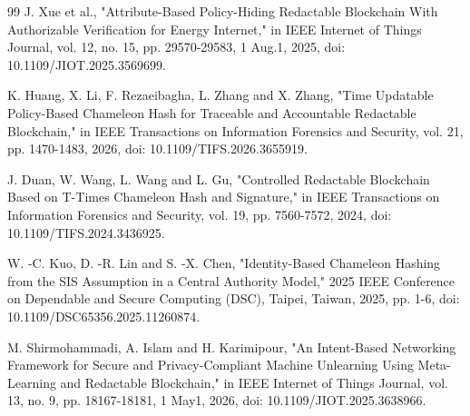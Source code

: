 \documentclass[lettersize,journal]{IEEEtran}
\begin{document}
\begin{thebibliography}{99}
    J. Xue et al., "Attribute-Based Policy-Hiding Redactable Blockchain With Authorizable Verification for Energy Internet," in IEEE Internet of Things Journal, vol. 12, no. 15, pp. 29570-29583, 1 Aug.1, 2025, doi: 10.1109/JIOT.2025.3569699.
    
    
    K. Huang, X. Li, F. Rezaeibagha, L. Zhang and X. Zhang, "Time Updatable Policy-Based Chameleon Hash for Traceable and Accountable Redactable Blockchain," in IEEE Transactions on Information Forensics and Security, vol. 21, pp. 1470-1483, 2026, doi: 10.1109/TIFS.2026.3655919.
    
    J. Duan, W. Wang, L. Wang and L. Gu, "Controlled Redactable Blockchain Based on T-Times Chameleon Hash and Signature," in IEEE Transactions on Information Forensics and Security, vol. 19, pp. 7560-7572, 2024, doi: 10.1109/TIFS.2024.3436925. 
    
    W. -C. Kuo, D. -R. Lin and S. -X. Chen, "Identity-Based Chameleon Hashing from the SIS Assumption in a Central Authority Model," 2025 IEEE Conference on Dependable and Secure Computing (DSC), Taipei, Taiwan, 2025, pp. 1-6, doi: 10.1109/DSC65356.2025.11260874.
    
    M. Shirmohammadi, A. Islam and H. Karimipour, "An Intent-Based Networking Framework for Secure and Privacy-Compliant Machine Unlearning Using Meta-Learning and Redactable Blockchain," in IEEE Internet of Things Journal, vol. 13, no. 9, pp. 18167-18181, 1 May1, 2026, doi: 10.1109/JIOT.2025.3638966. 
    \end{thebibliography}
    
    
\end{document}
